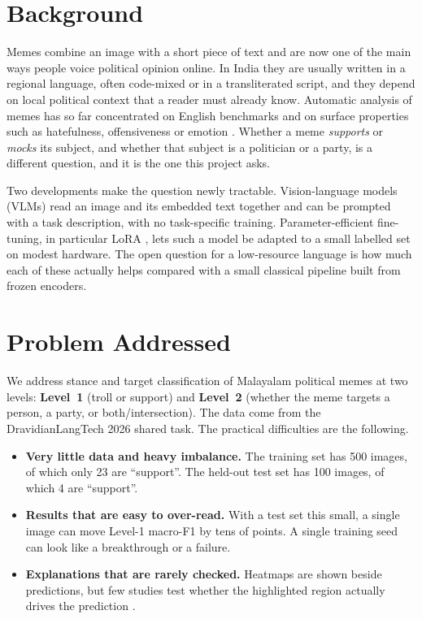 \section{Background}

Memes combine an image with a short piece of text and are now one of the main ways people voice political opinion online. In India they are usually written in a regional language, often code-mixed or in a transliterated script, and they depend on local political context that a reader must already know. Automatic analysis of memes has so far concentrated on English benchmarks and on surface properties such as hatefulness, offensiveness or emotion \cite{sharma2024emotion,arya2024clip,wu2024tcam}. Whether a meme \emph{supports} or \emph{mocks} its subject, and whether that subject is a politician or a party, is a different question, and it is the one this project asks.

Two developments make the question newly tractable. Vision-language models (VLMs) read an image and its embedded text together and can be prompted with a task description, with no task-specific training. Parameter-efficient fine-tuning, in particular LoRA \cite{hu2022lora}, lets such a model be adapted to a small labelled set on modest hardware. The open question for a low-resource language is how much each of these actually helps compared with a small classical pipeline built from frozen encoders.

\section{Problem Addressed}

We address stance and target classification of Malayalam political memes at two levels: \textbf{Level~1} (troll or support) and \textbf{Level~2} (whether the meme targets a person, a party, or both/intersection). The data come from the DravidianLangTech 2026 shared task. The practical difficulties are the following.

\begin{itemize}
    \item \textbf{Very little data and heavy imbalance.} The training set has 500 images, of which only 23 are ``support''. The held-out test set has 100 images, of which 4 are ``support''.
    \item \textbf{Results that are easy to over-read.} With a test set this small, a single image can move Level-1 macro-F1 by tens of points. A single training seed can look like a breakthrough or a failure.
    \item \textbf{Explanations that are rarely checked.} Heatmaps are shown beside predictions, but few studies test whether the highlighted region actually drives the prediction \cite{rodis2024mxai}.
\end{itemize}

